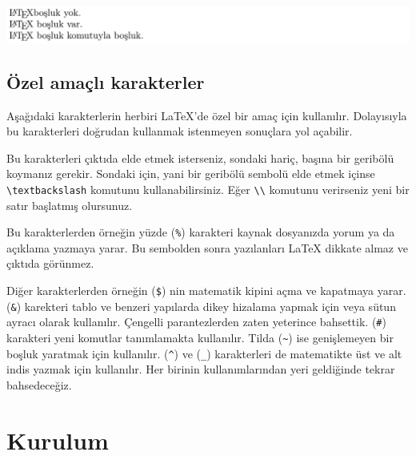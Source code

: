 \documentclass[
  10pt,
]{scrbook}
\newenvironment{Shaded}{}{}
\newcommand{\CommentTok}[1]{\textcolor[rgb]{0.38,0.63,0.69}{\textit{#1}}}
\newcommand{\NormalTok}[1]{#1}
\newcommand{\SpecialStringTok}[1]{\textcolor[rgb]{0.73,0.40,0.53}{#1}}
\theoremstyle{definition}
\theoremstyle{definition}
\theoremstyle{definition}
\theoremstyle{definition}
\theoremstyle{remark}
\begin{document}
\insvg

\includegraphics{examples/ex2.svg} \outsvg

\hypertarget{uxf6zel-amauxe7lux131-karakterler}{%
\subsection{Özel amaçlı karakterler}\label{uxf6zel-amauxe7lux131-karakterler}}

Aşağıdaki karakterlerin herbiri LaTeX'de özel bir amaç için kullanılır. Dolayısıyla bu karakterleri doğrudan kullanmak istenmeyen sonuçlara yol açabilir.

\begin{Shaded}
\begin{Highlighting}[]
\NormalTok{\# }\SpecialStringTok{$ }\CommentTok{\%   \&   \{   \}   \textasciitilde{}  \^{}  \_ \textbackslash{}}
\end{Highlighting}
\end{Shaded}

Bu karakterleri çıktıda elde etmek isterseniz, sondaki hariç, başına bir geribölü koymanız gerekir. Sondaki için, yani bir geribölü sembolü elde etmek içinse \texttt{\textbackslash{}textbackslash} komutunu kullanabilirsiniz. Eğer \texttt{\textbackslash{}\textbackslash{}} komutunu verirseniz yeni bir satır başlatmış olursunuz.

Bu karakterlerden örneğin yüzde (\texttt{\%}) karakteri kaynak dosyanızda yorum ya da açıklama yazmaya yarar. Bu sembolden sonra yazılanları LaTeX dikkate almaz ve çıktıda görünmez.

Diğer karakterlerden örneğin (\texttt{\$}) nin matematik kipini açma ve kapatmaya yarar. (\texttt{\&}) karekteri tablo ve benzeri yapılarda dikey hizalama yapmak için veya sütun ayracı olarak kullanılır. Çengelli parantezlerden zaten yeterince bahsettik. (\texttt{\#}) karakteri yeni komutlar tanımlamakta kullanılır. Tilda (\texttt{\textasciitilde{}}) ise genişlemeyen bir boşluk yaratmak için kullanılır. (\texttt{\^{}}) ve (\texttt{\_}) karakterleri de matematikte üst ve alt indis yazmak için kullanılır. Her birinin kullanımlarından yeri geldiğinde tekrar bahsedeceğiz.

\hypertarget{kurulum}{%
\section{Kurulum}\label{kurulum}}
\end{document}
